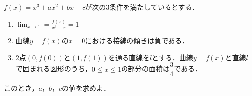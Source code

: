 $f(x)=x^3+ax^2+bx+c$が次の3条件を満たしているとする．
\begin{enumerate}
  \item ${\displaystyle \lim_{x\to 1}=\frac{f(x)}{x^3-x}= 1}$
  \item 曲線$y=f(x)$の$x=0$における接線の傾きは負である．
  \item 2点$(0,f(0))$と$(1,f(1))$を通る直線を$l$とする．曲線$y=f(x)$と直線$l$で囲まれる図形のうち，$0\le x\le 1$の部分の面積は$\dfrac{3}{4}$である．
\end{enumerate}
このとき，$a$，$b$，$c$の値を求めよ．
